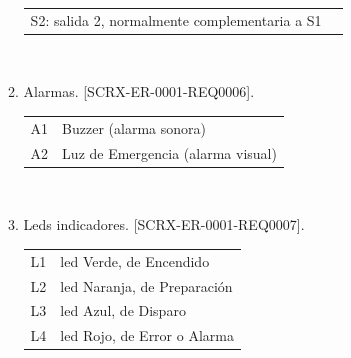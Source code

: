 \documentclass[
11pt, %
]{charter}
\begin{document}
\begin{enumerate}
\begin{enumerate}
\begin{tabular}{l l}
					S2: salida 2, normalmente complementaria a S1 \\
				\end{tabular} \\
			\item Alarmas. [SCRX-ER-0001-REQ0006]. \\
				\begin{tabular}{l l} \\
					A1 & Buzzer (alarma sonora) \\
					A2 & Luz de Emergencia (alarma visual) \\
				\end{tabular} \\
			\item Leds indicadores. [SCRX-ER-0001-REQ0007]. \\
				\begin{tabular}{l l} \\
					L1 & led Verde, de Encendido \\
					L2 & led Naranja, de Preparación \\
					L3 & led Azul, de Disparo \\
					L4 & led Rojo, de Error o Alarma \\
				\end{tabular} \\
		\end{enumerate}	
	

\end{enumerate}
\end{document}
